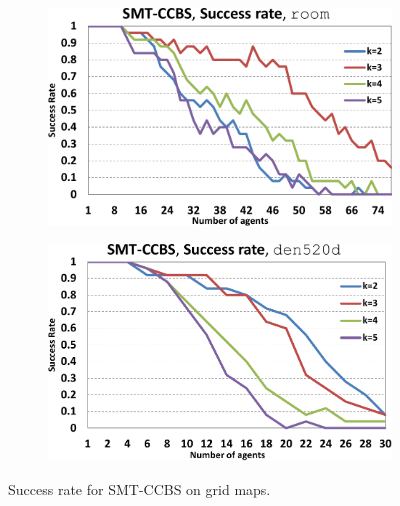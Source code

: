 \documentclass[review]{elsarticle}
\newcommand{\smtccbs}{SMT-CCBS\xspace}
\begin{document}
\begin{figure}[h]
\begin{subfigure}
    \begin{subfigure}
        \centering
        \includegraphics[width=0.45\linewidth]{mapfr-sr-plot-smtcbs-room.pdf}
    \end{subfigure}\hspace{0.025\linewidth}
    \begin{subfigure}
        \centering
        \includegraphics[width=0.45\linewidth]{mapfr-sr-plot-smtcbs-den520d.pdf}
    \end{subfigure}%
\end{subfigure}

\caption{Success rate for \smtccbs on grid maps.}
\label{fig:results-success-rate-smtcbs-grids}
\end{figure}
\end{document}
